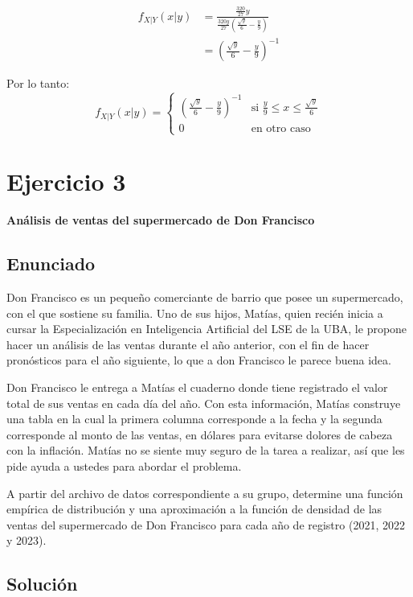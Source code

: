 \documentclass[11pt,a4paper]{article}
\begin{document}
\begin{align*}
f_{X|Y}(x|y) &= \frac{\frac{320}{27}y}{\frac{320y}{27} \left( \frac{\sqrt{y}}{6} - \frac{y}{9} \right)} \\
&= \left( \frac{\sqrt{y}}{6} - \frac{y}{9} \right)^{-1}
\end{align*}

Por lo tanto:
\[
f_{X|Y}(x|y) = \begin{cases}
\left( \frac{\sqrt{y}}{6} - \frac{y}{9} \right)^{-1} & \text{si } \frac{y}{9} \leq x \leq \frac{\sqrt{y}}{6} \\
0 & \text{en otro caso}
\end{cases}
\]

\section{Ejercicio 3}
\textbf{Análisis de ventas del supermercado de Don Francisco}

\subsection{Enunciado}
Don Francisco es un pequeño comerciante de barrio que posee un supermercado, con el que sostiene su familia. Uno de sus hijos, Matías, quien recién inicia a cursar la Especialización en Inteligencia Artificial del LSE de la UBA, le propone hacer un análisis de las ventas durante el año anterior, con el fin de hacer pronósticos para el año siguiente, lo que a don Francisco le parece buena idea.

Don Francisco le entrega a Matías el cuaderno donde tiene registrado el valor total de sus ventas en cada día del año. Con esta información, Matías construye una tabla en la cual la primera columna corresponde a la fecha y la segunda corresponde al monto de las ventas, en dólares para evitarse dolores de cabeza con la inflación. Matías no se siente muy seguro de la tarea a realizar, así que les pide ayuda a ustedes para abordar el problema.

A partir del archivo de datos correspondiente a su grupo, determine una función empírica de distribución y una aproximación a la función de densidad de las ventas del supermercado de Don Francisco para cada año de registro (2021, 2022 y 2023).

\subsection{Solución}
\end{document}
